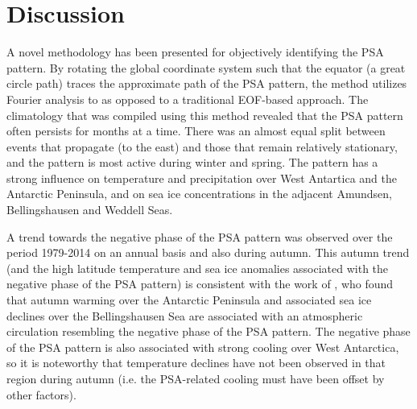 \section{Discussion}

A novel methodology has been presented for objectively identifying the PSA pattern. By rotating the global coordinate system such that the equator (a great circle path) traces the approximate path of the PSA pattern, the method utilizes Fourier analysis to as opposed to a traditional EOF-based approach. The climatology that was compiled using this method revealed that the PSA pattern often persists for months at a time. There was an almost equal split between events that propagate (to the east) and those that remain relatively stationary, and the pattern is most active during winter and spring. The pattern has a strong influence on temperature and precipitation over West Antartica and the Antarctic Peninsula, and on sea ice concentrations in the adjacent Amundsen, Bellingshausen and Weddell Seas. 

A trend towards the negative phase of the PSA pattern was observed over the period 1979-2014 on an annual basis and also during autumn. This autumn trend (and the high latitude temperature and sea ice anomalies associated with the negative phase of the PSA pattern) is consistent with the work of \citet{Ding2013}, who found that autumn warming over the Antarctic Peninsula and associated sea ice declines over the Bellingshausen Sea are associated with an atmospheric circulation resembling the negative phase of the PSA pattern. The negative phase of the PSA pattern is also associated with strong cooling over West Antarctica, so it is noteworthy that temperature declines have not been observed in that region during autumn (i.e. the PSA-related cooling must have been offset by other factors). 

